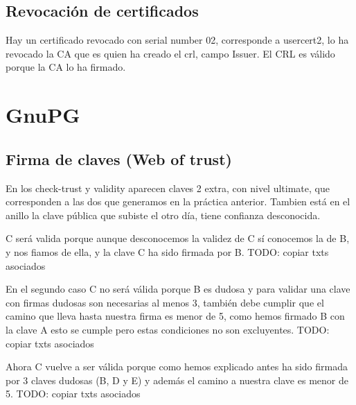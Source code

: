 \documentclass[11pt]{article}
\begin{document}
    \subsection{Revocación de certificados}
      \par
      Hay un certificado revocado con serial number 02, corresponde a usercert2, lo ha revocado la CA que
      es quien ha creado el crl, campo Issuer. El CRL es válido porque la CA lo ha firmado.

  \section{GnuPG}
    \subsection{Firma de claves (Web of trust)}
      \par
      En los check-trust y validity aparecen claves 2 extra, con nivel ultimate, que corresponden a las dos que generamos en
      la práctica anterior. Tambien está en el anillo la clave pública que subiste el otro día, tiene confianza desconocida.
      
      \bigskip
      \par
      C será valida porque aunque desconocemos la validez de C sí conocemos la de B, y nos
      fiamos de ella, y la clave C ha sido firmada por B.
      TODO: copiar txts asociados

      \bigskip
      \par
      En el segundo caso C no será válida porque B es dudosa y para validar una clave con firmas
      dudosas son necesarias al menos 3, también debe cumplir que el camino que lleva hasta nuestra
      firma es menor de 5, como hemos firmado B con la clave A esto se cumple pero estas condiciones
      no son excluyentes.
      TODO: copiar txts asociados

      \bigskip
      \par
      Ahora C vuelve a ser válida porque como hemos explicado antes ha sido firmada por 3 claves
      dudosas (B, D y E) y además el camino a nuestra clave es menor de 5.
      TODO: copiar txts asociados
    
\end{document}
